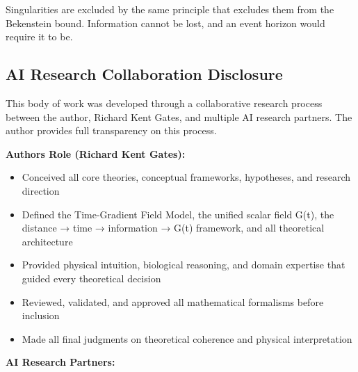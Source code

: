 \documentclass[
  10pt,
]{article}
\providecommand{\tightlist}{%
  \setlength{\itemsep}{0pt}\setlength{\parskip}{0pt}}
\begin{document}
Singularities are excluded by the same principle that excludes them from
the Bekenstein bound. Information cannot be lost, and an event horizon
would require it to be.

\hypertarget{ai-research-collaboration-disclosure}{%
\subsection{AI Research Collaboration
Disclosure}\label{ai-research-collaboration-disclosure}}

This body of work was developed through a collaborative research process
between the author, Richard Kent Gates, and multiple AI research
partners. The author provides full transparency on this process.

\textbf{Author\textquotesingle s Role (Richard Kent Gates):}

\begin{itemize}
\tightlist
\item
  Conceived all core theories, conceptual frameworks, hypotheses, and
  research direction
\item
  Defined the Time-Gradient Field Model, the unified scalar field G(t),
  the distance → time → information → G(t) framework, and all
  theoretical architecture
\item
  Provided physical intuition, biological reasoning, and domain
  expertise that guided every theoretical decision
\item
  Reviewed, validated, and approved all mathematical formalisms before
  inclusion
\item
  Made all final judgments on theoretical coherence and physical
  interpretation
\end{itemize}

\textbf{AI Research Partners:}
\end{document}
